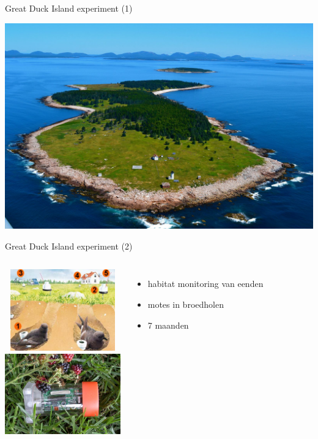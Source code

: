 \documentclass[presentation, bigger]{beamer}
\begin{document}
\begin{frame}[label=sec-1-3]{Great Duck Island experiment (1)}

\includegraphics[width=\textwidth,keepaspectration=true]{gdi/gdi.jpg}

\end{frame}
\begin{frame}[label=sec-1-4]{Great Duck Island experiment (2)}
\begin{columns}[t]
\centering
\includegraphics[width=5cm,height=3.5cm]{gdi/gdi_duckmote.jpg}\\
\includegraphics[width=5cm,height=3.5cm]{gdi/micamote.png}
\centering
\begin{itemize}
\item habitat monitoring van eenden
\item motes in broedholen
\item 7 maanden
\end{itemize}
\end{columns}
\end{frame}
\end{document}
